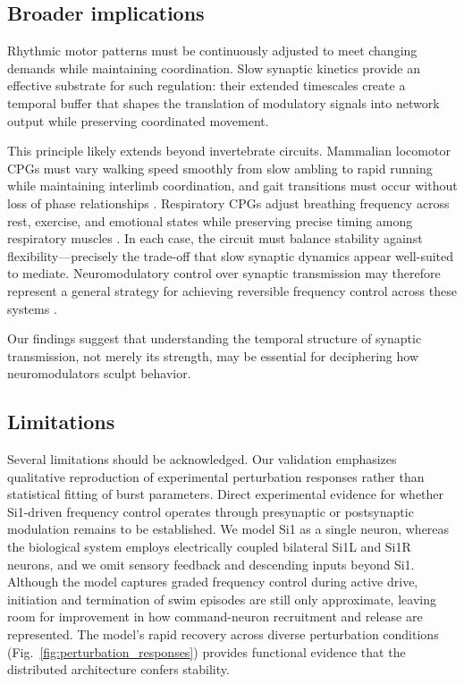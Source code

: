 \subsection*{Broader implications}

Rhythmic motor patterns must be continuously adjusted to meet changing demands while maintaining coordination.
Slow synaptic kinetics provide an effective substrate for such regulation: their extended timescales create a temporal buffer that shapes the translation of modulatory signals into network output while preserving coordinated movement.

This principle likely extends beyond invertebrate circuits.
Mammalian locomotor CPGs must vary walking speed smoothly from slow ambling to rapid running while maintaining interlimb coordination, and gait transitions must occur without loss of phase relationships \cite{Kiehn2006}.
Respiratory CPGs adjust breathing frequency across rest, exercise, and emotional states while preserving precise timing among respiratory muscles \cite{DelNegro2018}.
In each case, the circuit must balance stability against flexibility---precisely the trade-off that slow synaptic dynamics appear well-suited to mediate.
Neuromodulatory control over synaptic transmission may therefore represent a general strategy for achieving reversible frequency control across these systems \cite{NadimBucher2014}.

Our findings suggest that understanding the temporal structure of synaptic transmission, not merely its strength, may be essential for deciphering how neuromodulators sculpt behavior.

\subsection*{Limitations}

Several limitations should be acknowledged.
Our validation emphasizes qualitative reproduction of experimental perturbation responses rather than statistical fitting of burst parameters.
Direct experimental evidence for whether Si1-driven frequency control operates through presynaptic or postsynaptic modulation remains to be established.
We model Si1 as a single neuron, whereas the biological system employs electrically coupled bilateral Si1L and Si1R neurons, and we omit sensory feedback and descending inputs beyond Si1.
Although the model captures graded frequency control during active drive, initiation and termination of swim episodes are still only approximate, leaving room for improvement in how command-neuron recruitment and release are represented.
The model's rapid recovery across diverse perturbation conditions (Fig.~\ref{fig:perturbation_responses}) provides functional evidence that the distributed architecture confers stability.
